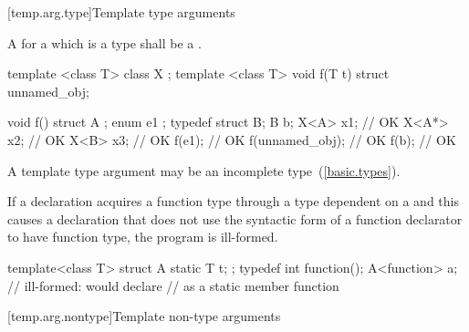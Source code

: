 [temp.arg.type]{Template type arguments}

\pnum
A
for a
which is a type
shall be a
.

\pnum
\enterexample
\begin{codeblock}
template <class T> class X { };
template <class T> void f(T t) { }
struct { } unnamed_obj;

void f() {
  struct A { };
  enum { e1 };
  typedef struct { } B;
  B b;
  X<A> x1;          // OK
  X<A*> x2;         // OK
  X<B> x3;          // OK
  f(e1);            // OK
  f(unnamed_obj);   // OK
  f(b);             // OK
}
\end{codeblock}
\exitexample
\enternote
A template type argument may be an incomplete type~(\ref{basic.types}).
\exitnote

\pnum
If a declaration acquires a function type through a type dependent on a
and this causes a declaration that does not use the
syntactic form of a function declarator to have function type,
the program is ill-formed.
\enterexample

\begin{codeblock}
template<class T> struct A {
  static T t;
};
typedef int function();
A<function> a;                  // ill-formed: would declare 
                                // as a static member function
\end{codeblock}
\exitexample

[temp.arg.nontype]{Template non-type arguments}

